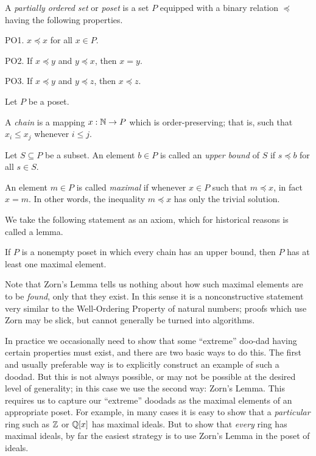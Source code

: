 \begin{dfn}[Poset]
A \emph{partially ordered set} or \emph{poset} is a set \(P\) equipped with a binary relation \(\preceq\) having the following properties.
\begin{proplist}
\item[PO1.] \(x \preceq x\) for all \(x \in P\).
\item[PO2.] If \(x \preceq y\) and \(y \preceq x\), then \(x = y\).
\item[PO3.] If \(x \preceq y\) and \(y \preceq z\), then \(x \preceq z\).
\end{proplist}
\end{dfn}

\begin{dfn}
Let \(P\) be a poset.
\begin{proplist}
\item A \emph{chain} is a mapping \(x : \mathbb{N} \rightarrow P\) which is order-preserving; that is, such that \(x_i \leq x_j\) whenever \(i \leq j\).
\item Let \(S \subseteq P\) be a subset.
An element \(b \in P\) is called an \emph{upper bound} of \(S\) if \(s \preceq b\) for all \(s \in S\).
\item An element \(m \in P\) is called \emph{maximal} if whenever \(x \in P\) such that \(m \preceq x\), in fact \(x = m\).
In other words, the inequality \(m \preceq x\) has only the trivial solution.
\end{proplist}
\end{dfn}

We take the following statement as an axiom, which for historical reasons is called a lemma.

\begin{axiom}
If \(P\) is a nonempty poset in which every chain has an upper bound, then \(P\) has at least one maximal element.
\end{axiom}

Note that Zorn's Lemma tells us nothing about how such maximal elements are to be \emph{found}, only that they exist.
In this sense it is a nonconstructive statement very similar to the Well-Ordering Property of natural numbers; proofs which use Zorn may be slick, but cannot generally be turned into algorithms.

In practice we occasionally need to show that some ``extreme'' doo-dad having certain properties must exist, and there are two basic ways to do this.
The first and usually preferable way is to explicitly construct an example of such a doodad.
But this is not always possible, or may not be possible at the desired level of generality; in this case we use the second way: Zorn's Lemma.
This requires us to capture our ``extreme'' doodads as the maximal elements of an appropriate poset.
For example, in many cases it is easy to show that a \emph{particular} ring such as \(\mathbb{Z}\) or \(\mathbb{Q}[x]\) has maximal ideals.
But to show that \emph{every} ring has maximal ideals, by far the easiest strategy is to use Zorn's Lemma in the poset of ideals.


